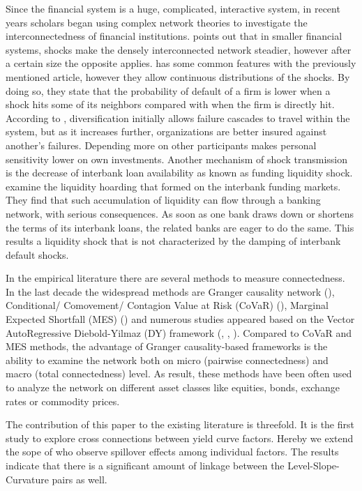 \documentclass[12pt,bibliography=totoc]{article}
\begin{document}
Since the financial system is a huge, complicated, interactive system, in recent years scholars began using complex network theories to investigate the interconnectedness of financial institutions. 
\cite{acemoglu2015systemic} points out that in smaller financial systems, shocks make the densely interconnected network steadier, however after a certain size the opposite applies. 
\cite{glasserman2015likely} has some common features with the previously mentioned article, however they allow continuous distributions of the shocks. 
By doing so, they state that the probability of default of a firm is lower when a shock hits some of its neighbors compared with when the firm is directly hit.
According to \cite{elliott2014financial}, diversification initially allows failure cascades to travel within the system, but as it increases further, organizations are better insured against another's failures. 
Depending more on other participants makes personal sensitivity lower on own investments. 
Another mechanism of shock transmission is the decrease of interbank loan availability as known as funding liquidity shock.
\cite{gai2010contagion} examine the liquidity hoarding that formed on the interbank funding markets. 
They find that such accumulation of liquidity can flow through a banking network, with serious consequences. 
As soon as one bank draws down or shortens the terms of its interbank loans, the related banks are eager to do the same. 
This results a liquidity shock that is not characterized by the damping of interbank default shocks.

In the empirical literature there are several methods to measure connectedness. 
In the last decade the widespread methods are Granger causality network (\cite{billio2012econometric}), Conditional/ Comovement/ Contagion Value at Risk (CoVaR) (\cite{adrian2008federal}), Marginal Expected Shortfall (MES) (\cite{acharya2012capital}) and numerous studies appeared based on the Vector AutoRegressive Diebold-Yilmaz (DY) framework (\cite{diebold2009measuring}, \cite{diebold2012better}, \cite{diebold2014network}). 
Compared to CoVaR and MES methods, the advantage of Granger causality-based frameworks is the ability to examine the network both on micro (pairwise connectedness) and macro (total connectedness) level. 
As result, these methods have been often used to analyze the network on different asset classes like equities, bonds, exchange rates or commodity prices. 


The contribution of this paper to the existing literature is threefold. It is the first study to explore cross connections between yield curve factors. Hereby we extend the sope of \cite{sowmya2016linkages} who observe spillover effects among individual factors. The results indicate that there is a significant amount of linkage between the Level-Slope-Curvature pairs as well.
\end{document}
